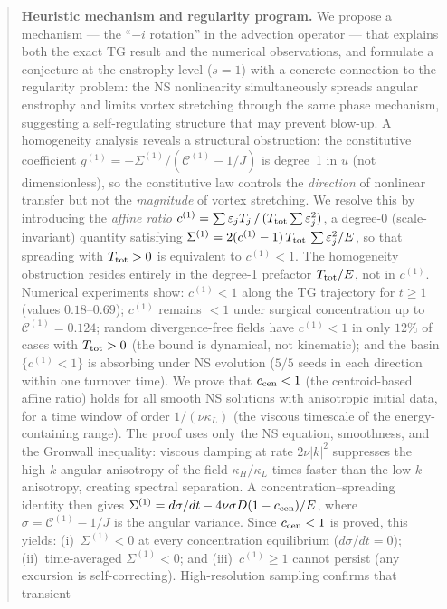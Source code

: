 \documentclass[11pt]{article}
\theoremstyle{definition}
\newcommand{\cC}{\mathcal{C}}
\begin{document}
\begin{abstract}
\smallskip\noindent\textbf{Heuristic mechanism and
regularity program.}
We propose a mechanism --- the ``$-i$ rotation'' in the
advection operator --- that explains both the exact TG
result and the numerical observations, and formulate a
conjecture at the enstrophy level ($s=1$) with a concrete
connection to the regularity problem: the NS nonlinearity
simultaneously spreads angular enstrophy and limits
vortex stretching through the same phase mechanism,
suggesting a self-regulating structure that may prevent
blow-up.  A homogeneity analysis reveals
a structural obstruction: the constitutive coefficient
$g^{(1)}=-\Sigma^{(1)}/(\cC^{(1)}-1/J)$ is degree~1
in $u$ (not dimensionless), so the constitutive law
controls the \emph{direction} of nonlinear transfer
but not the \emph{magnitude} of vortex stretching.
We resolve this by introducing the \emph{affine ratio}
$c^{(1)} = \sum\varepsilon_j T_j\,/\,
(T_{\rm tot}\sum\varepsilon_j^2)$,
a degree-0 (scale-invariant) quantity satisfying
$\Sigma^{(1)} = 2(c^{(1)}-1)\,T_{\rm tot}\,
\sum\varepsilon_j^2/E$, so that spreading with
$T_{\rm tot}>0$ is equivalent to $c^{(1)}<1$.
The homogeneity obstruction resides entirely in the
degree-1 prefactor $T_{\rm tot}/E$, not in $c^{(1)}$.
Numerical experiments show: $c^{(1)}<1$ along the TG
trajectory for $t\geq 1$ (values $0.18$--$0.69$);
$c^{(1)}$ remains $<1$ under surgical concentration up to
$\cC^{(1)}=0.124$; random divergence-free fields have
$c^{(1)}<1$ in only $12\%$ of cases with $T_{\rm tot}>0$
(the bound is dynamical, not kinematic); and the basin
$\{c^{(1)}<1\}$ is absorbing under NS evolution
($5/5$ seeds in each direction within one turnover time).
We prove that $c_{\rm cen}<1$ (the centroid-based
affine ratio) holds for all smooth NS solutions
with anisotropic initial data, for a time window
of order $1/(\nu\kappa_L)$ (the viscous timescale
of the energy-containing range).  The proof uses
only the NS equation, smoothness, and the Gronwall
inequality: viscous damping at rate $2\nu|k|^2$
suppresses the high-$k$ angular anisotropy of the
field $\kappa_H/\kappa_L$ times faster than the
low-$k$ anisotropy, creating spectral separation.
A concentration--spreading identity then gives
$\Sigma^{(1)} = d\sigma/dt
- 4\nu\sigma D(1-c_{\rm cen})/E$, where
$\sigma = \cC^{(1)}-1/J$ is the angular variance.
Since $c_{\rm cen}<1$ is proved, this yields:
(i)~$\Sigma^{(1)}<0$ at every concentration
equilibrium ($d\sigma/dt=0$);
(ii)~time-averaged $\Sigma^{(1)}<0$; and
(iii)~$c^{(1)}\geq 1$ cannot persist (any
excursion is self-correcting).
High-resolution sampling confirms that transient

\end{abstract}
\end{document}
